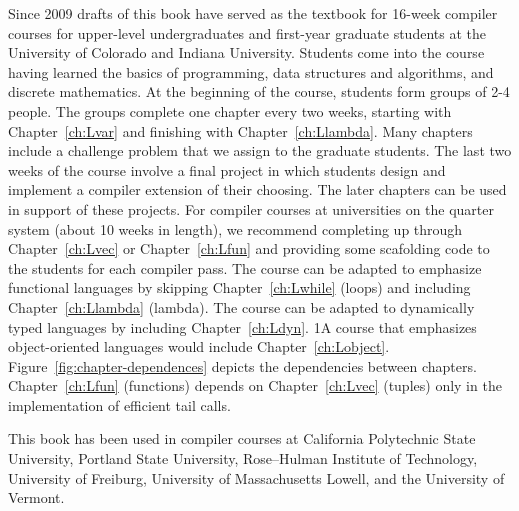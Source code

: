 \documentclass[7x10,nocrop]{TimesAPriori_MIT}%
\def\pythonEd{1}
\def\edition{0}
\newcommand{\python}[1]{{\if\edition\pythonEd #1\fi}}
\begin{document}
Since 2009 drafts of this book have served as the textbook for 16-week
compiler courses for upper-level undergraduates and first-year
graduate students at the University of Colorado and Indiana
University.
%
Students come into the course having learned the basics of
programming, data structures and algorithms, and discrete
mathematics.
%
At the beginning of the course, students form groups of 2-4 people.
The groups complete one chapter every two weeks, starting with
Chapter~\ref{ch:Lvar} and finishing with
Chapter~\ref{ch:Llambda}. Many chapters include a challenge problem
that we assign to the graduate students. The last two weeks of the
course involve a final project in which students design and implement
a compiler extension of their choosing.  The later chapters can be
used in support of these projects.  For compiler courses at
universities on the quarter system (about 10 weeks in length), we
recommend completing up through Chapter~\ref{ch:Lvec} or
Chapter~\ref{ch:Lfun} and providing some scafolding code to the
students for each compiler pass.
%
The course can be adapted to emphasize functional languages by
skipping Chapter~\ref{ch:Lwhile} (loops) and including
Chapter~\ref{ch:Llambda} (lambda). The course can be adapted to
dynamically typed languages by including Chapter~\ref{ch:Ldyn}.
%
\python{A course that emphasizes object-oriented languages would
  include Chapter~\ref{ch:Lobject}.}
%
Figure~\ref{fig:chapter-dependences} depicts the dependencies between
chapters. Chapter~\ref{ch:Lfun} (functions) depends on
Chapter~\ref{ch:Lvec} (tuples) only in the implementation of efficient
tail calls.

This book has been used in compiler courses at California Polytechnic
State University, Portland State University, Rose–Hulman Institute of
Technology, University of Freiburg, University of Massachusetts
Lowell, and the University of Vermont.
\end{document}
